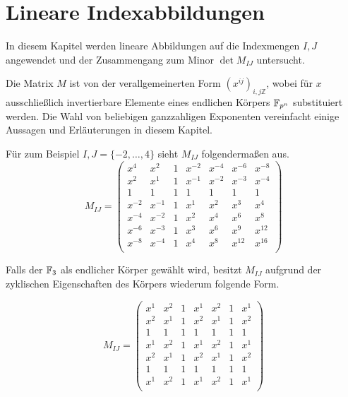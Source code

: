 \section{Lineare Indexabbildungen}

In diesem Kapitel werden lineare Abbildungen auf die Indexmengen $I,J$ angewendet und der Zusammengang zum Minor $\det M_{IJ}$ untersucht.

Die Matrix $M$ ist von der verallgemeinerten Form $\left( x^{ij} \right)_{i,j \mathbb{Z}}$, wobei für $x$ ausschließlich invertierbare Elemente eines endlichen Körpers $\field{p}[n]$ substituiert werden. Die Wahl von beliebigen ganzzahligen Exponenten vereinfacht einige Aussagen und Erläuterungen in diesem Kapitel.

Für zum Beispiel $I,J = \{-2, \dots, 4\}$ sieht $M_{IJ}$ folgendermaßen aus.
\begin{equation*}
    M_{IJ} = \begin{pmatrix}
        x^4     & x^{2} & 1    & x^{-2} & x^{-4}& x^{-6}& x^{-8}\\
        x^{2}   & x^{1} & 1    & x^{-1} & x^{-2}& x^{-3}& x^{-4}\\
        1       & 1     & 1    & 1      & 1     & 1     & 1     \\
        x^{-2}  & x^{-1}& 1    & x^{1}  & x^{2} & x^{3} & x^{4} \\
        x^{-4}  & x^{-2}& 1    & x^{2}  & x^{4} & x^{6} & x^{8} \\
        x^{-6}  & x^{-3}& 1    & x^{3}  & x^{6} & x^{9} & x^{12} \\
        x^{-8}  & x^{-4}& 1    & x^{4}  & x^{8} & x^{12} & x^{16} \\
    \end{pmatrix}
\end{equation*}

Falls der $\field{3}$ als endlicher Körper gewählt wird, besitzt $M_{IJ}$ aufgrund der zyklischen Eigenschaften des Körpers wiederum folgende Form.

\begin{equation*}
    M_{IJ} = \begin{pmatrix}
        x^1     & x^{2} & 1     & x^{1} & x^{2} & 1 & x^{1} \\
        x^{2}   & x^{1} & 1     & x^{2} & x^{1} & 1 & x^{2} \\
        1       & 1     & 1     & 1     & 1     & 1 & 1     \\
        x^{1}   & x^{2} & 1     & x^{1} & x^{2} & 1 & x^{1} \\
        x^{2}   & x^{1} & 1     & x^{2} & x^{1} & 1 & x^{2} \\
        1       & 1     & 1     & 1     & 1     & 1 & 1     \\
        x^1     & x^2   & 1     & x^1   & x^2   & 1 & x^1   \\
    \end{pmatrix}
\end{equation*}

